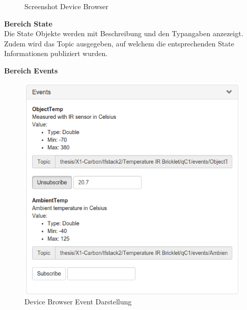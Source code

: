 {\begin{figure}[H]
	\centering
	\caption{Screenshot Device Browser}
\end{figure}

\textbf{Bereich State} \\
Die State Objekte werden mit Beschreibung und den Typangaben anzezeigt. Zudem wird das Topic ausgegeben, auf welchem die entsprechenden State Informationen publiziert wurden.

\newpage
\textbf{Bereich Events}

\begin{figure}[H]
	\centering
        \includegraphics[width=0.7\linewidth]{bilder/device_browser_events.png} 
    \caption{Device Browser Event Darstellung}
\end{figure}

}
